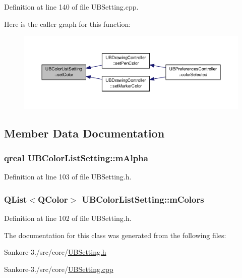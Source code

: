 Definition at line 140 of file U\-B\-Setting.\-cpp.



Here is the caller graph for this function\-:
\nopagebreak
\begin{figure}[H]
\begin{center}
\leavevmode
\includegraphics[width=350pt]{da/df0/class_u_b_color_list_setting_a0fe42d180ba4ef279b4b0567ee2fc719_icgraph}
\end{center}
\end{figure}




\subsection{Member Data Documentation}
\hypertarget{class_u_b_color_list_setting_a704825f4ff4430d0c610570bb0d786e2}{
\subsubsection[{m\-Alpha}]{\setlength{\rightskip}{0pt plus 5cm}qreal U\-B\-Color\-List\-Setting\-::m\-Alpha\hspace{0.3cm}{\ttfamily [protected]}}}\label{da/df0/class_u_b_color_list_setting_a704825f4ff4430d0c610570bb0d786e2}


Definition at line 103 of file U\-B\-Setting.\-h.

\hypertarget{class_u_b_color_list_setting_ae030ba8227cd556be337aeb580c4d517}{
\subsubsection[{m\-Colors}]{\setlength{\rightskip}{0pt plus 5cm}Q\-List$<$Q\-Color$>$ U\-B\-Color\-List\-Setting\-::m\-Colors\hspace{0.3cm}{\ttfamily [protected]}}}\label{da/df0/class_u_b_color_list_setting_ae030ba8227cd556be337aeb580c4d517}


Definition at line 102 of file U\-B\-Setting.\-h.



The documentation for this class was generated from the following files\-:\begin{DoxyCompactItemize}
\item 
Sankore-\/3./src/core/\hyperlink{_u_b_setting_8h}{U\-B\-Setting.\-h}\item 
Sankore-\/3./src/core/\hyperlink{_u_b_setting_8cpp}{U\-B\-Setting.\-cpp}\end{DoxyCompactItemize}
